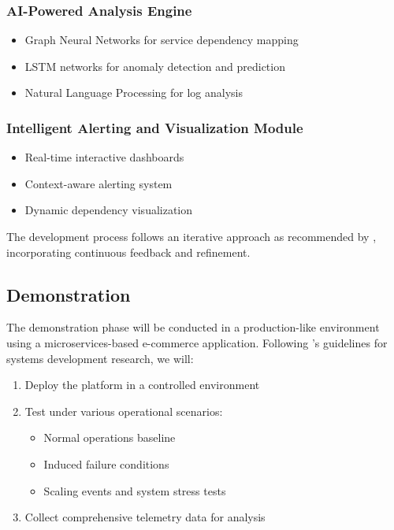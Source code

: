 \documentclass[10pt,journal,compsoc]{IEEEtran}
\begin{document}
\subsubsection{AI-Powered Analysis Engine}
\begin{itemize}
    \item Graph Neural Networks for service dependency mapping
    \item LSTM networks for anomaly detection and prediction
    \item Natural Language Processing for log analysis
\end{itemize}

\subsubsection{Intelligent Alerting and Visualization Module}
\begin{itemize}
    \item Real-time interactive dashboards
    \item Context-aware alerting system
    \item Dynamic dependency visualization
\end{itemize}

The development process follows an iterative approach as recommended by \cite{hevner2004design}, incorporating continuous feedback and refinement.

\subsection{Demonstration}

The demonstration phase will be conducted in a production-like environment using a microservices-based e-commerce application. Following \cite{nunamaker1990systems}'s guidelines for systems development research, we will:

\begin{enumerate}
    \item Deploy the platform in a controlled environment
    \item Test under various operational scenarios:
    \begin{itemize}
        \item Normal operations baseline
        \item Induced failure conditions
        \item Scaling events and system stress tests
    \end{itemize}
    \item Collect comprehensive telemetry data for analysis
\end{enumerate}
\end{document}
